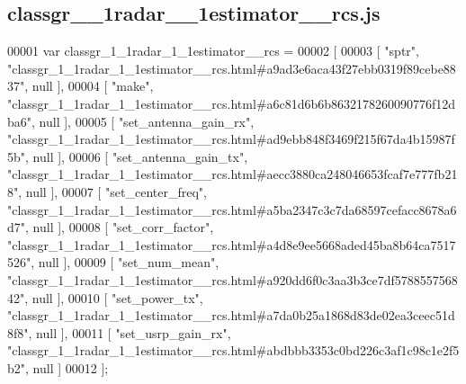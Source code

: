 \subsection{classgr\+\_\+\_\+1radar\+\_\+\_\+1estimator\+\_\+\+\_\+rcs.\+js}
\label{classgr__1__1radar__1__1estimator____rcs_8js_source}

\begin{DoxyCode}
00001 var classgr_1_1radar_1_1estimator__rcs =
00002 [
00003     [ \textcolor{stringliteral}{"sptr"}, \textcolor{stringliteral}{"classgr\_1\_1radar\_1\_1estimator\_\_rcs.html#a9ad3e6aca43f27ebb0319f89cebe8837"}, null ],
00004     [ \textcolor{stringliteral}{"make"}, \textcolor{stringliteral}{"classgr\_1\_1radar\_1\_1estimator\_\_rcs.html#a6c81d6b6b8632178260090776f12dba6"}, null ],
00005     [ \textcolor{stringliteral}{"set\_antenna\_gain\_rx"}, \textcolor{stringliteral}{"classgr\_1\_1radar\_1\_1estimator\_\_rcs.html#ad9ebb848f3469f215f67da4b15987f5b"}, 
      null ],
00006     [ \textcolor{stringliteral}{"set\_antenna\_gain\_tx"}, \textcolor{stringliteral}{"classgr\_1\_1radar\_1\_1estimator\_\_rcs.html#aecc3880ca248046653fcaf7e777fb218"}, 
      null ],
00007     [ \textcolor{stringliteral}{"set\_center\_freq"}, \textcolor{stringliteral}{"classgr\_1\_1radar\_1\_1estimator\_\_rcs.html#a5ba2347c3c7da68597cefacc8678a6d7"}, null 
      ],
00008     [ \textcolor{stringliteral}{"set\_corr\_factor"}, \textcolor{stringliteral}{"classgr\_1\_1radar\_1\_1estimator\_\_rcs.html#a4d8e9ee5668aded45ba8b64ca7517526"}, null 
      ],
00009     [ \textcolor{stringliteral}{"set\_num\_mean"}, \textcolor{stringliteral}{"classgr\_1\_1radar\_1\_1estimator\_\_rcs.html#a920dd6f0c3aa3b3ce7df578855756842"}, null ],
00010     [ \textcolor{stringliteral}{"set\_power\_tx"}, \textcolor{stringliteral}{"classgr\_1\_1radar\_1\_1estimator\_\_rcs.html#a7da0b25a1868d83de02ea3ceec51d8f8"}, null ],
00011     [ \textcolor{stringliteral}{"set\_usrp\_gain\_rx"}, \textcolor{stringliteral}{"classgr\_1\_1radar\_1\_1estimator\_\_rcs.html#abdbbb3353c0bd226c3af1c98c1e2f5b2"}, null
       ]
00012 ];
\end{DoxyCode}
